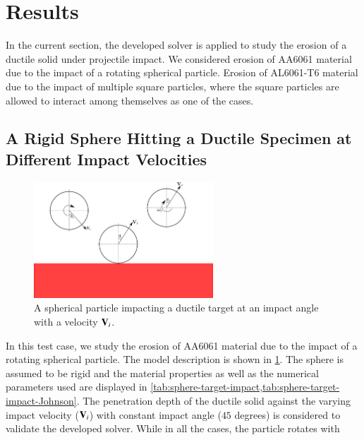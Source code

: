 \FloatBarrier%
\section{Results}
\label{sec:erosion-results}
In the current section, the developed solver is applied to study the erosion of
a ductile solid under projectile impact. We considered erosion of AA6061
material due to the impact of a rotating spherical particle. Erosion of
AL6061-T6 material due to the impact of multiple square particles, where the
square particles are allowed to interact among themselves as one of the cases.


\FloatBarrier%
\subsection{A Rigid Sphere Hitting a Ductile Specimen at Different Impact Velocities}
\label{sec:erosion-vyas}
\begin{figure}[!htpb]
  \centering
  \includegraphics[width=0.6\textwidth]{images/erosion/images/vyas_2021_rebound_kinematics_3d/cao_drawing}
  \caption{A spherical particle impacting a ductile target at an impact angle
    with a velocity $\mathbf{V}_i$.}
\label{fig:results-cao-3d-erosion-schematic}
\end{figure}
In this test case, we study the erosion of AA6061 material due to the impact of
a rotating spherical particle. The model description is shown in
\cref{fig:results-cao-3d-erosion-schematic}. The sphere is assumed to be rigid
and the material properties as well as the numerical parameters used are
displayed in \cref{tab:sphere-target-impact,tab:sphere-target-impact-Johnson}.
The penetration depth of the ductile solid against the varying impact velocity
($\mathbf{V}_i$) with constant impact angle ($45$ degrees) is considered to
validate the developed solver. While in all the cases, the particle rotates with
